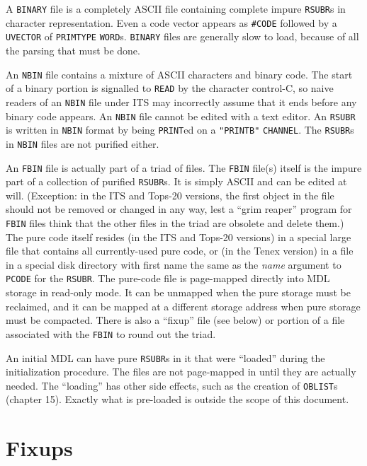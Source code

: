 \documentclass[a4paper]{scrbook}
\begin{document}
A \texttt{BINARY} file is a completely ASCII file containing complete impure \texttt{RSUBR}s in character representation.
Even a code vector appears as \texttt{\#CODE} followed by a \texttt{UVECTOR} of \texttt{PRIMTYPE} \texttt{WORD}s.
\texttt{BINARY} files are generally slow to load, because of all the parsing that must be done.

An \texttt{NBIN} file contains a mixture of ASCII characters and binary code. The start of a binary portion is signalled to
\texttt{READ} by the character control-C, so naive readers of an \texttt{NBIN} file under ITS may
incorrectly assume that it ends before any binary code appears. An \texttt{NBIN} file cannot be edited with a text editor.
An \texttt{RSUBR} is written in \texttt{NBIN} format by being \texttt{PRINT}ed on a \texttt{"PRINTB"} \texttt{CHANNEL}. The
\texttt{RSUBR}s in \texttt{NBIN} files are not purified either.

An \texttt{FBIN} file is actually part of a triad of files. The \texttt{FBIN} file(s) itself is the impure part of a
collection of purified \texttt{RSUBR}s. It is simply ASCII and can be edited at will. (Exception: in the ITS and
Tops-20 versions, the first object in the file should not be removed or changed in any way, lest a
``grim reaper'' program for \texttt{FBIN} files think that the other files in the triad are obsolete and delete them.) The
pure code itself resides (in the ITS and Tops-20 versions) in a special large file that contains all currently-used pure
code, or (in the Tenex version) in a file in a special disk directory with first name the same as the
\emph{name} argument to \texttt{PCODE} for the \texttt{RSUBR}. The pure-code file is page-mapped directly into MDL storage
in read-only mode. It can be unmapped when the pure storage must be reclaimed, and it can be mapped at a different storage
address when pure storage must be compacted. There is also a ``fixup'' file (see below) or portion of a file associated
with the \texttt{FBIN} to round out the triad.

An initial MDL can have pure \texttt{RSUBR}s in it that were ``loaded'' during the initialization procedure. The files are
not page-mapped in until they are actually needed. The ``loading'' has other side effects, such as the creation of
\texttt{OBLIST}s (chapter 15). Exactly what is pre-loaded is outside the scope of this document.

\section{Fixups}\label{fixups}
\end{document}

